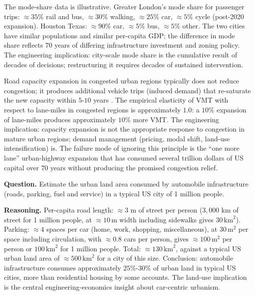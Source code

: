 The mode-share data is illustrative. Greater London's mode share for passenger trips: $\approx 35\%$ rail and bus, $\approx 30\%$ walking, $\approx 25\%$ car, $\approx 5\%$ cycle (post-2020 expansion). Houston Texas: $\approx 90\%$ car, $\approx 5\%$ bus, $\approx 5\%$ other. The two cities have similar populations and similar per-capita GDP; the difference in mode share reflects $70$ years of differing infrastructure investment and zoning policy. The engineering implication: city-scale mode share is the cumulative result of decades of decisions; restructuring it requires decades of sustained intervention.

\begin{principle}
Road capacity expansion in congested urban regions typically does not reduce congestion; it produces additional vehicle trips (induced demand) that re-saturate the new capacity within $5$-$10$ years \cite{paper:duranton-turner-2011}. The empirical elasticity of VMT with respect to lane-miles in congested regions is approximately $1.0$: a $10\%$ expansion of lane-miles produces approximately $10\%$ more VMT. The engineering implication: capacity expansion is not the appropriate response to congestion in mature urban regions; demand management (pricing, modal shift, land-use intensification) is. The failure mode of ignoring this principle is the ``one more lane'' urban-highway expansion that has consumed several trillion dollars of US capital over $70$ years without producing the promised congestion relief.
\end{principle}

\begin{estimation}
\textbf{Question.} Estimate the urban land area consumed by automobile infrastructure (roads, parking, fuel and service) in a typical US city of 1 million people.

\textbf{Reasoning.} Per-capita road length: $\approx 3$ m of street per person ($3{,}000$ km of street for 1 million people, at $\approx 10\,\text{m}$ width including sidewalks gives $30\,\text{km}^2$). Parking: $\approx 4$ spaces per car (home, work, shopping, miscellaneous), at $30\,\text{m}^2$ per space including circulation, with $\approx 0.8$ cars per person, gives $\approx 100\,\text{m}^2$ per person or $100\,\text{km}^2$ for 1 million people. Total: $\approx 130\,\text{km}^2$, against a typical US urban land area of $\approx 500\,\text{km}^2$ for a city of this size. Conclusion: automobile infrastructure consumes approximately $25\%$-$30\%$ of urban land in typical US cities, more than residential housing by some accounts. The land-use implication is the central engineering-economics insight about car-centric urbanism.
\end{estimation}

